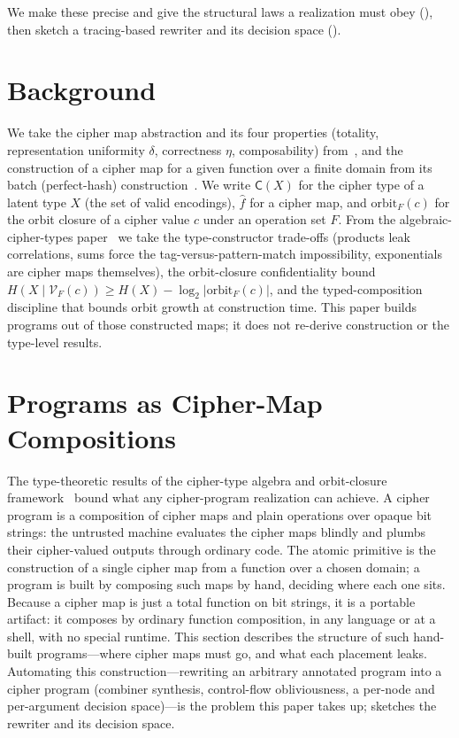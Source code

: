 \documentclass[11pt]{article}
\theoremstyle{definition}
\theoremstyle{plain}
\theoremstyle{remark}
\newcommand{\fhat}{\hat{f}}
\newcommand{\cipher}[1]{\mathsf{C}(#1)}
\newcommand{\orbitF}{\mathrm{orbit}_F}
\begin{document}
We make these precise and give the structural laws a realization must
obey (), then sketch a tracing-based rewriter and
its decision space ().


\section{Background}
\label{sec:background}

We take the cipher map abstraction and its four properties (totality,
representation uniformity $\delta$, correctness $\eta$, composability)
from~\cite{towell2026cipher}, and the construction of a cipher map for a
given function over a finite domain from its batch (perfect-hash)
construction~\cite[Sec.~6]{towell2026cipher}.
We write $\cipher{X}$ for the cipher type of a latent type $X$ (the set
of valid encodings), $\fhat$ for a cipher map, and $\orbitF(c)$ for the
orbit closure of a cipher value $c$ under an operation set $F$.
From the algebraic-cipher-types paper~\cite{towell2026algebraic} we take
the type-constructor trade-offs (products leak correlations, sums force
the tag-versus-pattern-match impossibility, exponentials are cipher maps
themselves), the orbit-closure confidentiality bound
$H(X \mid \mathcal{V}_F(c)) \geq H(X) - \log_2|\orbitF(c)|$, and the
typed-composition discipline that bounds orbit growth at construction
time.
This paper builds programs out of those constructed maps; it does not
re-derive construction or the type-level results.

\section{Programs as Cipher-Map Compositions}
\label{sec:realizing}

The type-theoretic results of the cipher-type algebra and orbit-closure framework~\cite{towell2026algebraic} bound what any
cipher-program realization can achieve.
A cipher program is a composition of cipher maps and plain operations
over opaque bit strings: the untrusted machine evaluates the cipher
maps blindly and plumbs their cipher-valued outputs through ordinary
code.
The atomic primitive is the construction of a single cipher map from a
function over a chosen domain; a program is built by composing such
maps by hand, deciding where each one sits.
Because a cipher map is just a total function on bit strings, it is a
portable artifact: it composes by ordinary function composition, in
any language or at a shell, with no special runtime.
This section describes the structure of such hand-built programs---where
cipher maps must go, and what each placement leaks.
Automating this construction---rewriting an arbitrary annotated
program into a cipher program (combiner synthesis, control-flow
obliviousness, a per-node and per-argument decision space)---is the
problem this paper takes up;  sketches the rewriter and
its decision space.
\end{document}
